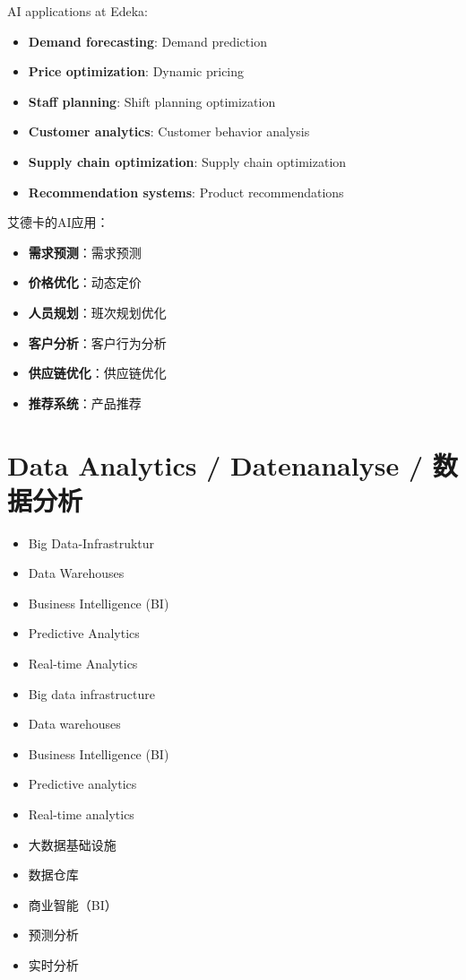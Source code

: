 AI applications at Edeka:
\begin{itemize}
    \item \textbf{Demand forecasting}: Demand prediction
    \item \textbf{Price optimization}: Dynamic pricing
    \item \textbf{Staff planning}: Shift planning optimization
    \item \textbf{Customer analytics}: Customer behavior analysis
    \item \textbf{Supply chain optimization}: Supply chain optimization
    \item \textbf{Recommendation systems}: Product recommendations
\end{itemize}

艾德卡的AI应用：
\begin{itemize}
    \item \textbf{需求预测}：需求预测
    \item \textbf{价格优化}：动态定价
    \item \textbf{人员规划}：班次规划优化
    \item \textbf{客户分析}：客户行为分析
    \item \textbf{供应链优化}：供应链优化
    \item \textbf{推荐系统}：产品推荐
\end{itemize}

\section{Data Analytics / Datenanalyse / 数据分析}

\begin{otherlanguage}{ngerman}
\begin{itemize}
    \item Big Data-Infrastruktur
    \item Data Warehouses
    \item Business Intelligence (BI)
    \item Predictive Analytics
    \item Real-time Analytics
\end{itemize}
\end{otherlanguage}

\begin{itemize}
    \item Big data infrastructure
    \item Data warehouses
    \item Business Intelligence (BI)
    \item Predictive analytics
    \item Real-time analytics
\end{itemize}

\begin{itemize}
    \item 大数据基础设施
    \item 数据仓库
    \item 商业智能（BI）
    \item 预测分析
    \item 实时分析
\end{itemize}
